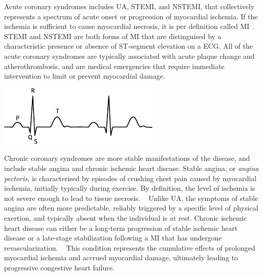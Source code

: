 Acute coronary syndromes includes 
\ac{UA}, \ac{STEMI}, and \ac{NSTEMI},
that collectively represents a spectrum of acute onset or progression of 
myocardial ischemia.
If the ischemia is sufficient to cause myocardial necrosis, 
it is per definition called \ac{MI}~\autocite{thygesenFourth2019}.
\ac{STEMI} and \ac{NSTEMI} are both forms of \ac{MI} that are distinguised
by a characteristic presence or absence of ST-segment elevation on a \ac{ECG}.
All of the acute coronary syndromes are typically associated 
with acute plaque change and atherothrombosis, 
and are medical emergencies that require immediate 
intervention to limit or prevent myocardial damage.
~\autocite{kumarRobbins2014}

\begin{marginfigure}%
    \vspace{1em}
    \includegraphics{graphics/electrocardiogram}
    \caption[An example electrocardiogram]{%
        Schematic of a normal sinus rhythm as seen from an ECG. 
        In \ac{STEMI}, the ST-segment is found elevated.
    }
    \vspace{1em}
    \label{fig:ecg}
\end{marginfigure}%

Chronic coronary syndromes are more stable manifestations of the disease,
and include stable angina and chronic ischemic heart disease.
Stable angina, or \textit{angina pectoris}, is characterised by episodes of
crushing chest pain caused by myocardial ischemia, initially typically during
exercise.
By definition, the level of ischemia is not severe enough to lead to
tissue necrosis. 
~\autocite{knuuti20192020}
Unlike \ac{UA}, the symptoms of stable angina are often more predictable,
reliably triggered by a specific level of physical exertion, 
and typically absent when the individual is at rest. 
Chronic ischemic heart disease can either be a long-term progression of stable
ischemic heart disease or a late-stage stabilization following a \ac{MI} that
has undergone revascularization. 
~\autocite{knuuti20192020}
This condition represents the cumulative
effects of prolonged myocardial ischemia and accrued myocardial damage,
ultimately leading to progressive congestive heart failure.
~\autocite{kumarRobbins2014}

